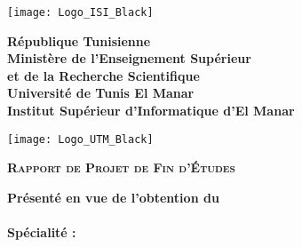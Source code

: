 

\thispagestyle{cover}%
\hspace{-47pt}
\begin{minipage}[l]{0.2\columnwidth}
\vspace{6mm}
\texttt{[image: Logo\_ISI\_Black]}\\
\end{minipage}
\hfill
\begin{minipage}[l]{0.6\columnwidth}
\centering
\footnotesize
\textbf{{République Tunisienne}}\\
\vspace{1.5mm}
\textbf{{Ministère de l'Enseignement Supérieur\\
et de la Recherche Scientifique}}\\
\vspace{1.5mm}
\textbf{{Université de Tunis El Manar}}\\
\vspace{1.5mm}
\textbf{{Institut Supérieur d'Informatique d’El Manar}}
\end{minipage}
\hfill
\begin{minipage}[l]{0.02\columnwidth}
\end{minipage}
\hfill
\begin{minipage}[l]{0.18\columnwidth}
\vspace{6mm}
\texttt{[image: Logo\_UTM\_Black]}\\
\end{minipage}
\vskip1.5cm

\begin{center}
{\LARGE{\textbf{\textsc{Rapport de Projet de Fin d'\'Etudes}}}}\\
\vskip0.5cm
\large

{\textbf{Présenté en vue de l'obtention du}}\\
\vskip2mm
{\textbf{\@diplomaName}}\\
{\textbf{Spécialité : \@speciality}}\\
{}
\end{center}

